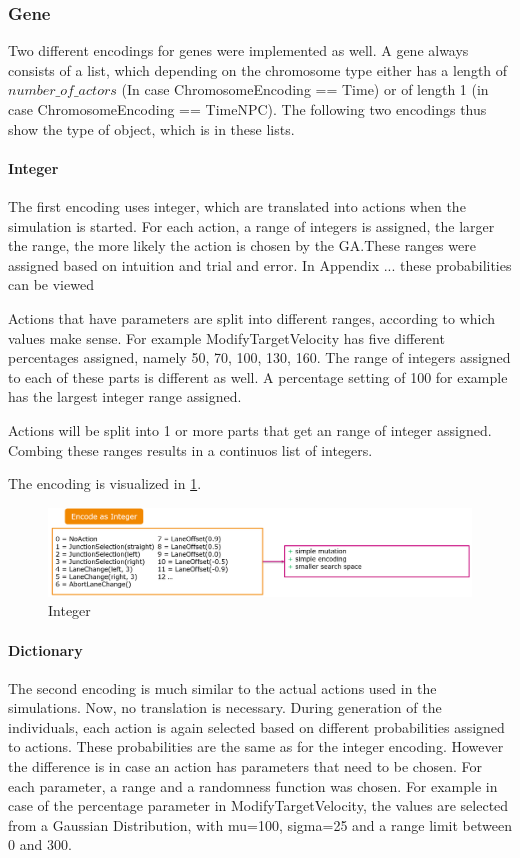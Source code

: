 \subsubsection{Gene}
Two different encodings for genes were implemented as well. A gene always consists of a list, which depending on the chromosome type either has a length of $number\_of\_actors$ (In case ChromosomeEncoding == Time) or of length 1 (in case ChromosomeEncoding == TimeNPC). The following two encodings thus show the type of object, which is in these lists.

\paragraph{Integer}
The first encoding uses integer, which are translated into actions when the simulation is started. For each action, a range of integers is assigned, the larger the range, the more likely the action is chosen by the GA.These ranges were assigned based on intuition and trial and error. In Appendix ... these probabilities can be viewed

Actions that have parameters are split into different ranges, according to which values make sense. For example ModifyTargetVelocity has five different percentages assigned, namely 50, 70, 100, 130, 160. The range of integers assigned to each of these parts is different as well. A percentage setting of 100 for example has the largest integer range assigned.

Actions will be split into 1 or more parts that get an range of integer assigned. Combing these ranges results in a continuos list of integers.


The encoding is visualized in \ref{figure:encoding:gene:int}.


\begin{figure}[ht] 
	\includegraphics[width=1\linewidth]{figures/int_encoding}
	\caption{Integer}
	\label{figure:encoding:gene:int}
\end{figure}

\paragraph{Dictionary}
The second encoding is much similar to the actual actions used in the simulations. Now, no translation is necessary. During generation of the individuals, each action is again selected based on different probabilities assigned to actions. These probabilities are the same as for the integer encoding. However the difference is in case an action has parameters that need to be chosen. 
For each parameter, a range and a randomness function was chosen. For example in case of the percentage parameter in ModifyTargetVelocity, the values are selected from a Gaussian Distribution, with mu=100, sigma=25 and a range limit between 0 and 300.

